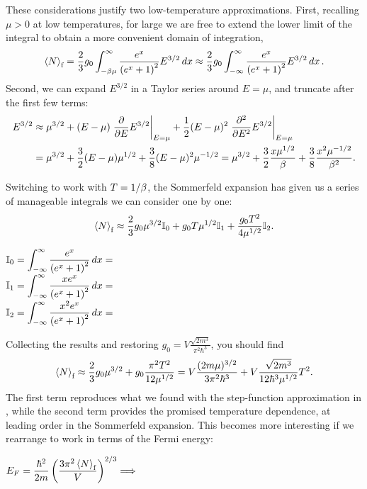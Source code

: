 These considerations justify two low-temperature approximations.
First, recalling $\mu > 0$ at low temperatures, for large \be we are free to extend the lower limit of the integral to obtain a more convenient domain of integration,
\begin{equation*}
  \left\langle N \right\rangle_{\text{f}} = \frac{2}{3} g_0 \int_{-\beta\mu}^{\infty} \frac{e^x}{\left(e^x + 1\right)^2} E^{3 / 2} \mathop{dx} \approx \frac{2}{3} g_0 \int_{-\infty}^{\infty} \frac{e^x}{\left(e^x + 1\right)^2} E^{3 / 2} \mathop{dx}.
\end{equation*}
Second, we can expand $E^{3 / 2}$ in a Taylor series around $E = \mu$, and truncate after the first few terms:
\begin{align*}
  E^{3 / 2} & \approx \mu^{3 / 2} + (E - \mu) \left. \frac{\partial }{\partial E} E^{3 / 2}\right|_{E = \mu} + \frac{1}{2} (E - \mu)^2 \left. \frac{\partial^2 }{\partial E^2} E^{3 / 2}\right|_{E = \mu} \\
            & = \mu^{3 / 2} + \frac{3}{2} (E - \mu) \mu^{1 / 2} + \frac{3}{8} (E - \mu)^2 \mu^{-1 / 2} = \mu^{3 / 2} + \frac{3}{2} \frac{x \mu^{1 / 2}}{\beta} + \frac{3}{8} \frac{x^2 \mu^{-1 / 2}}{\beta^2}.
\end{align*}

Switching to work with $T = 1 / \beta$, the Sommerfeld expansion has given us a series of manageable integrals we can consider one by one:
\begin{equation*}
  \left\langle N \right\rangle_{\text{f}} \approx \frac{2}{3} g_0 \mu^{3 / 2} \mathbb I_0 + g_0 T \mu^{1 / 2} \mathbb I_1 + \frac{g_0 T^2}{4\mu^{1 / 2}} \mathbb I_2.
\end{equation*}
\begin{mdframed}
  $\displaystyle \mathbb I_0 = \int_{-\infty}^{\infty} \frac{e^x}{\left(e^x + 1\right)^2} \mathop{dx} = $ \\[80 pt]
  $\displaystyle \mathbb I_1 = \int_{-\infty}^{\infty} \frac{x e^x}{\left(e^x + 1\right)^2} \mathop{dx} = $ \\[80 pt]
  $\displaystyle \mathbb I_2 = \int_{-\infty}^{\infty} \frac{x^2 e^x}{\left(e^x + 1\right)^2} \mathop{dx} = $ \\[110 pt] %
\end{mdframed}
Collecting the results and restoring $g_0 = V \frac{\sqrt{2m^3}}{\pi^2 \hbar^3}$, you should find
\begin{equation*}
  \left\langle N \right\rangle_{\text{f}} \approx \frac{2}{3} g_0 \mu^{3 / 2} + g_0 \frac{\pi^2 T^2}{12\mu^{1 / 2}} = V \frac{(2m\mu)^{3 / 2}}{3\pi^2\hbar^3} + V \frac{\sqrt{2m^3}}{12\hbar^3 \mu^{1 / 2}} T^2.
\end{equation*}
The first term reproduces what we found with the step-function approximation in , while the second term provides the promised temperature dependence, at leading order in the Sommerfeld expansion.
This becomes more interesting if we rearrange  to work in terms of the Fermi energy:
\begin{mdframed}
  $\displaystyle E_F = \frac{\hbar^2}{2m}\left(\frac{3\pi^2 \left\langle N \right\rangle_{\text{f}}}{V}\right)^{2 / 3} \Longrightarrow $ \\[120 pt]
\end{mdframed}

